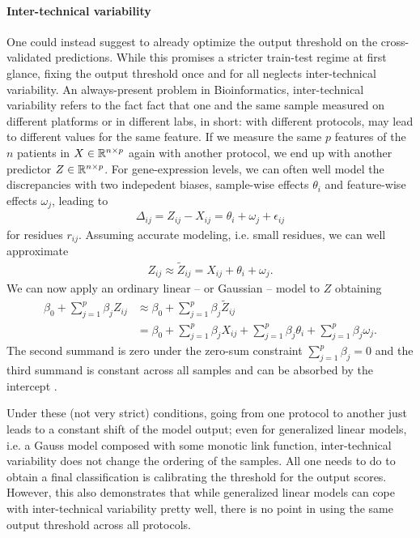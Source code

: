 \paragraph{Inter-technical variability} 
One could instead suggest to already optimize the output threshold on the cross-validated 
predictions. While this promises a stricter train-test regime at first glance, fixing the output 
threshold once and for all neglects inter-technical variability. An always-present problem in 
Bioinformatics, inter-technical variability refers to the fact fact that one and the same sample 
measured on different platforms or in different labs, in short: with different protocols, may 
lead to different values for the same feature. If we measure the same $p$ features of the $n$ 
patients in $X \in \mathbb{R}^{n \times p}$ again with another protocol, we end up with another predictor 
$Z \in \mathbb{R}^{n \times p}$.
For gene-expression levels,
we can often well model the discrepancies with two indepedent biases, sample-wise effects $\theta_i$
and feature-wise effects $\omega_j$, leading to
\begin{align}
    \Delta_{ij} = Z_{ij} - X_{ij} = \theta_i + \omega_j + \epsilon_{ij}
\end{align}
for residues $r_{ij}$. Assuming accurate modeling, i.e. small residues, we can well approximate
\begin{align}
    Z_{ij} \approx \tilde{Z}_{ij} = X_{ij} + \theta_i + \omega_j.
\end{align}
We can now apply an ordinary linear -- or Gaussian -- model to $Z$ obtaining
\begin{align}
    \beta_0 + \sum_{j=1}^p \beta_j Z_{ij} &\approx \beta_0 + \sum_{j=1}^p \beta_j \tilde{Z}_{ij} \\
    &= \beta_0 + \sum_{j=1}^p \beta_j X_{ij} + \sum_{j=1}^p \beta_j \theta_i + \sum_{j=1}^p \beta_j \omega_j.
\end{align}
The second summand is zero under the zero-sum constraint $\sum_{j = 1}^p \beta_j = 0$ and the third 
summand is constant across all samples and can be absorbed by the intercept \cite{transplatform17}. 

Under these (not very 
strict) conditions, going from one protocol to another just leads to a constant shift of the model 
output; even for generalized linear models, i.e. a Gauss model composed with some monotic link function,
inter-technical variability does not change the ordering of the samples. All one needs to do to 
obtain a final classification is calibrating the threshold for the output scores. However, this 
also demonstrates that while generalized linear models can cope with inter-technical variability 
pretty well, there is no point in using the same output threshold across all protocols.

